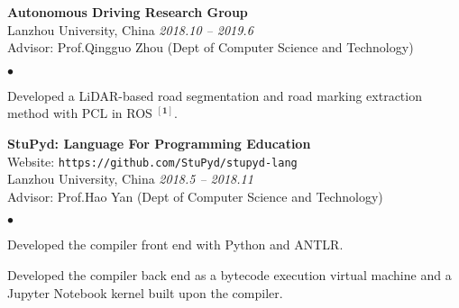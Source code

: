 \documentclass[margin,line,pifont,palatino,courier]{res}
\newenvironment{list2}{
	\begin{list}{$\bullet$}{%
			\setlength{\itemsep}{0in}
			\setlength{\parsep}{0in} \setlength{\parskip}{0in}
			\setlength{\topsep}{0in} \setlength{\partopsep}{0in}
			\setlength{\leftmargin}{0.2in}}}{\end{list}}
\begin{document}
\begin{resume}
		{\bf Autonomous Driving Research Group} \\
		Lanzhou University, China \hfill {\sl 2018.10 -- 2019.6} \\
		Advisor: Prof.Qingguo Zhou (Dept of Computer Science and Technology)
		\begin{list2}
			\item Developed a LiDAR-based road segmentation and road marking extraction method with PCL in ROS $\mathbf{^{[1]}}$.
		\end{list2}
		
		{\bf StuPyd: Language For Programming Education} \\
		Website: \verb+https://github.com/StuPyd/stupyd-lang+ \\
		Lanzhou University, China \hfill {\sl 2018.5 -- 2018.11} \\
		Advisor: Prof.Hao Yan (Dept of Computer Science and Technology)
		\begin{list2}
			\item Developed the compiler front end with Python and ANTLR.
			\item Developed the compiler back end as a bytecode execution virtual machine and a Jupyter Notebook kernel built upon the compiler. 
		\end{list2}	
		
		

\end{resume}
\end{document}
